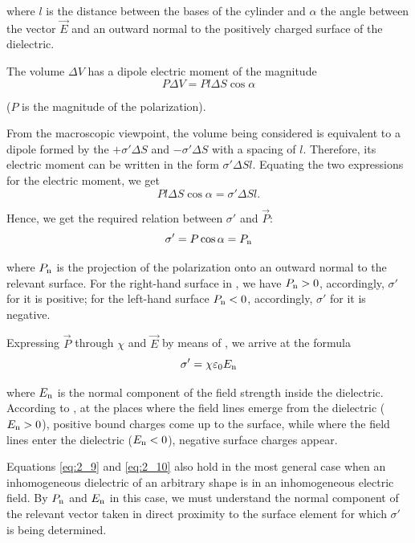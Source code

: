 \noindent
where $l$ is the distance between the bases of the cylinder and $\alpha$ the angle between the vector $\vec{E}$ and an outward normal to the positively charged surface of the dielectric.

The volume $\Delta{V}$ has a dipole electric moment of the magnitude
\begin{equation*}
    P\Delta{V} = Pl\Delta{S}\cos\alpha
\end{equation*}

\noindent
($P$ is the magnitude of the polarization).

From the macroscopic viewpoint, the volume being considered is equivalent to a dipole formed by the $+\sigma'\Delta{S}$ and $-\sigma'\Delta{S}$ with a spacing of $l$. Therefore, its electric moment can be written in the form $\sigma'\Delta{S}l$. Equating the two expressions for the electric moment, we get
\begin{equation*}
    Pl\Delta{S}\cos\alpha = \sigma'\Delta{S}l.
\end{equation*}

\noindent
Hence, we get the required relation between $\sigma'$ and $\vec{P}$:
\begin{equation}\label{eq:2_9}
    \sigma' = P \cos\alpha = P_{\text{n}}
\end{equation}

\noindent
where $P_{\text{n}}$ is the projection of the polarization onto an outward normal to the relevant surface. For the right-hand surface in , we have $P_{\text{n}}>0$, accordingly, $\sigma'$ for it is positive; for the left-hand surface $P_{\text{n}}<0$, accordingly, $\sigma'$ for it is negative.

Expressing $\vec{P}$ through $\chi$ and $\vec{E}$ by means of , we arrive at the formula
\begin{equation}\label{eq:2_10}
    \sigma' = \chi \varepsilon_0 E_{\text{n}}
\end{equation}

\noindent
where $E_{\text{n}}$ is the normal component of the field strength inside the dielectric. According to , at the places where the field lines emerge from the dielectric ($E_{\text{n}}>0$), positive bound charges come up to the surface, while where the field lines enter the dielectric ($E_{\text{n}}<0$), negative surface charges appear.

Equations \eqref{eq:2_9} and \eqref{eq:2_10} also hold in the most general case when an inhomogeneous dielectric of an arbitrary shape is in an inhomogeneous electric field. By $P_{\text{n}}$ and $E_{\text{n}}$ in this case, we must understand the normal component of the relevant vector taken in direct proximity to the surface element for which $\sigma'$ is being determined.


